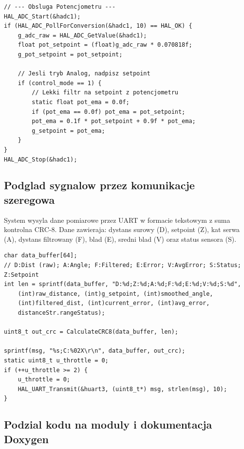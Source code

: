\documentclass[11pt]{article}
\begin{document}
\begin{lstlisting}[caption={Odczyt setpointu z potencjometru ADC (main.c)}, style=cstyle]
// --- Obsluga Potencjometru ---
HAL_ADC_Start(&hadc1);
if (HAL_ADC_PollForConversion(&hadc1, 10) == HAL_OK) {
    g_adc_raw = HAL_ADC_GetValue(&hadc1);
    float pot_setpoint = (float)g_adc_raw * 0.070818f; 
    g_pot_setpoint = pot_setpoint; 
    
    // Jesli tryb Analog, nadpisz setpoint
    if (control_mode == 1) {
        // Lekki filtr na setpoint z potencjometru
        static float pot_ema = 0.0f;
        if (pot_ema == 0.0f) pot_ema = pot_setpoint;
        pot_ema = 0.1f * pot_setpoint + 0.9f * pot_ema;
        g_setpoint = pot_ema;
    }
}
HAL_ADC_Stop(&hadc1);
\end{lstlisting}

\subsection{Podglad sygnalow przez komunikacje szeregowa}

System wysyla dane pomiarowe przez UART w formacie tekstowym z suma kontrolna CRC-8. Dane zawieraja: dystans surowy (D), setpoint (Z), kat serwa (A), dystans filtrowany (F), blad (E), sredni blad (V) oraz status sensora (S).

\begin{lstlisting}[caption={Wysylanie danych przez UART z CRC (main.c)}, style=cstyle]
char data_buffer[64];
// D:Dist (raw); A:Angle; F:Filtered; E:Error; V:AvgError; S:Status; Z:Setpoint
int len = sprintf(data_buffer, "D:%d;Z:%d;A:%d;F:%d;E:%d;V:%d;S:%d", 
    (int)raw_distance, (int)g_setpoint, (int)smoothed_angle, 
    (int)filtered_dist, (int)current_error, (int)avg_error, 
    distanceStr.rangeStatus);

uint8_t out_crc = CalculateCRC8(data_buffer, len);

sprintf(msg, "%s;C:%02X\r\n", data_buffer, out_crc);
static uint8_t u_throttle = 0;
if (++u_throttle >= 2) {
    u_throttle = 0;
    HAL_UART_Transmit(&huart3, (uint8_t*) msg, strlen(msg), 10);
}
\end{lstlisting}

\subsection{Podzial kodu na moduly i dokumentacja Doxygen}
\end{document}

